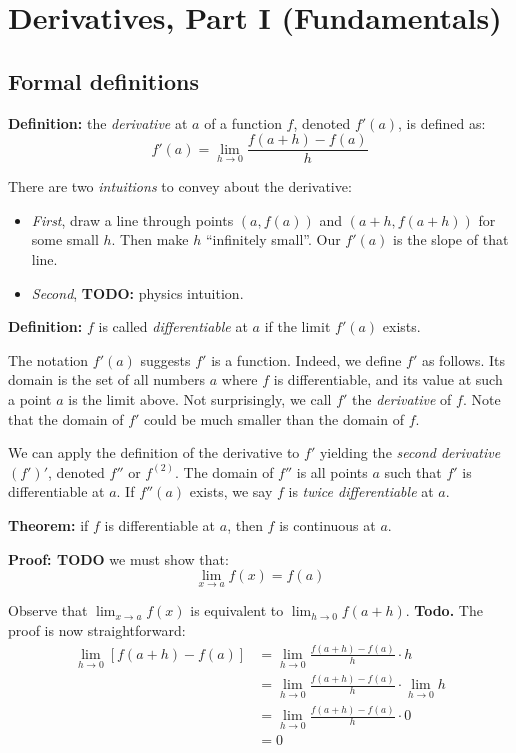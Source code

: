 
\section{Derivatives, Part I (Fundamentals)}

\subsection{Formal definitions}

\textbf{Definition:} the \textit{derivative} at $a$ of a function $f$,
denoted $f'(a)$, is defined as:
\[f'(a)=\lim_{h\to0}\frac{f(a+h)-f(a)}{h}\]

There are two \textit{intuitions} to convey about the derivative:
\begin{itemize}
\item \textit{First}, draw a line through points $(a, f(a))$ and
  $(a+h, f(a+h))$ for some small $h$. Then make $h$ ``infinitely
  small''. Our $f'(a)$ is the slope of that line.
\item \textit{Second}, \textbf{TODO:} physics intuition.
\end{itemize}

\textbf{Definition:} $f$ is called \textit{differentiable} at $a$ if
the limit $f'(a)$ exists.

\vs

The notation $f'(a)$ suggests $f'$ is a function. Indeed, we define
$f'$ as follows. Its domain is the set of all numbers $a$ where $f$ is
differentiable, and its value at such a point $a$ is the limit above.
Not surprisingly, we call $f'$ the \textit{derivative} of $f$. Note
that the domain of $f'$ could be much smaller than the domain of $f$.

\vs

We can apply the definition of the derivative to $f'$ yielding the
\textit{second derivative} $(f')'$, denoted $f''$ or $f^{(2)}$. The
domain of $f''$ is all points $a$ such that $f'$ is differentiable at
$a$. If $f''(a)$ exists, we say $f$ is \textit{twice differentiable}
at $a$.

\vs

\textbf{Theorem:} if $f$ is differentiable at $a$, then $f$ is
continuous at $a$.

\textbf{Proof: TODO} we must show that:
\[\lim_{x\to a}f(x)=f(a)\]

Observe that $\lim_{x\to a}f(x)$ is equivalent to $\lim_{h\to 0}f(a+h)$.
\textbf{Todo.} The proof is now straightforward:
\begin{align*}
  \lim_{h\to0}[f(a+h)-f(a)]&=\lim_{h\to0}\frac{f(a+h)-f(a)}{h}\cdot h\\
                         &=\lim_{h\to0}\frac{f(a+h)-f(a)}{h}\cdot \lim_{h\to
                           0}h\\
                         &=\lim_{h\to0}\frac{f(a+h)-f(a)}{h}\cdot 0\\
                         &=0
\end{align*}

